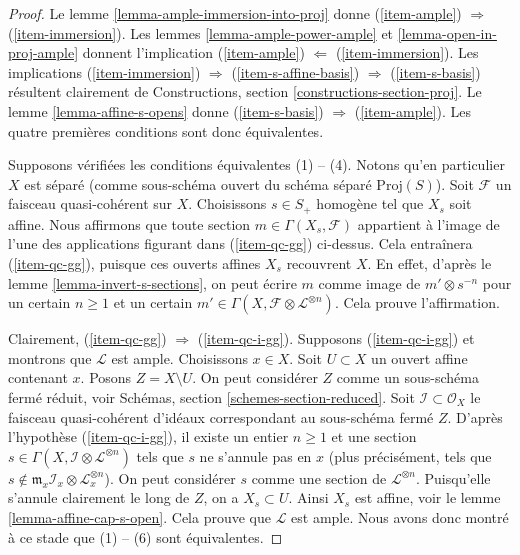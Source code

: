 \begin{proof}
Le lemme \ref{lemma-ample-immersion-into-proj} donne
(\ref{item-ample}) $\Rightarrow$ (\ref{item-immersion}).
Les lemmes \ref{lemma-ample-power-ample} et \ref{lemma-open-in-proj-ample}
donnent l'implication
(\ref{item-ample}) $\Leftarrow$ (\ref{item-immersion}).
Les implications (\ref{item-immersion}) $\Rightarrow$
(\ref{item-s-affine-basis}) $\Rightarrow$ (\ref{item-s-basis})
résultent clairement de Constructions, section \ref{constructions-section-proj}.
Le lemme \ref{lemma-affine-s-opens} donne
(\ref{item-s-basis}) $\Rightarrow$ (\ref{item-ample}).
Les quatre premières conditions sont donc équivalentes.

\medskip\noindent
Supposons vérifiées les conditions équivalentes (1) -- (4).
Notons qu'en particulier $X$ est séparé (comme sous-schéma
ouvert du schéma séparé $\text{Proj}(S)$).
Soit $\mathcal{F}$ un faisceau quasi-cohérent sur $X$.
Choisissons $s \in S_{+}$ homogène tel que $X_s$ soit affine.
Nous affirmons que toute section $m \in \Gamma(X_s, \mathcal{F})$
appartient à l'image de l'une des applications figurant dans
(\ref{item-qc-gg}) ci-dessus. Cela entraînera (\ref{item-qc-gg}),
puisque ces ouverts affines $X_s$ recouvrent $X$.
En effet, d'après le lemme \ref{lemma-invert-s-sections}, on peut écrire
$m$ comme image de $m' \otimes s^{-n}$ pour un certain
$n \geq 1$ et un certain
$m' \in \Gamma(X, \mathcal{F} \otimes \mathcal{L}^{\otimes n})$.
Cela prouve l'affirmation.

\medskip\noindent
Clairement, (\ref{item-qc-gg}) $\Rightarrow$ (\ref{item-qc-i-gg}).
Supposons (\ref{item-qc-i-gg}) et montrons que $\mathcal{L}$ est
ample. Choisissons $x \in X$. Soit $U \subset X$ un ouvert affine
contenant $x$. Posons $Z = X \setminus U$. On peut considérer
$Z$ comme un sous-schéma fermé réduit, voir
Schémas, section \ref{schemes-section-reduced}.
Soit $\mathcal{I} \subset \mathcal{O}_X$ le faisceau quasi-cohérent
d'idéaux correspondant au sous-schéma fermé $Z$.
D'après l'hypothèse (\ref{item-qc-i-gg}), il existe un entier $n \geq 1$ et une section
$s \in \Gamma(X, \mathcal{I} \otimes \mathcal{L}^{\otimes n})$
tels que $s$ ne s'annule pas en $x$ (plus précisément, tels que
$s \not \in \mathfrak m_x \mathcal{I}_x \otimes \mathcal{L}_x^{\otimes n}$).
On peut considérer $s$ comme une section de $\mathcal{L}^{\otimes n}$.
Puisqu'elle s'annule clairement le long de $Z$, on a
$X_s \subset U$. Ainsi $X_s$ est affine, voir
le lemme \ref{lemma-affine-cap-s-open}.
Cela prouve que $\mathcal{L}$ est ample.
Nous avons donc montré à ce stade que (1) -- (6) sont équivalentes.


\end{proof}

